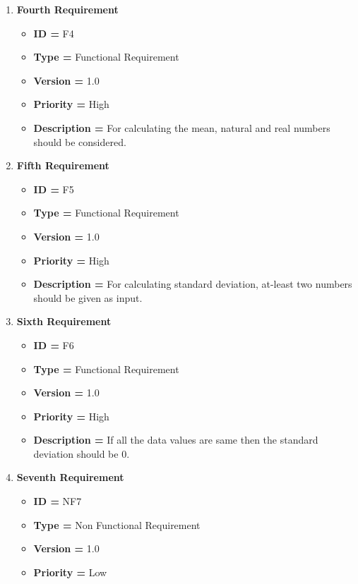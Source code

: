 \documentclass[a4paper, 12pt]{article}
\begin{document}
\begin{enumerate}[noitemsep]
        \newpage
        \item \textbf{Fourth Requirement}
        \begin{itemize}[noitemsep]
            \item \textbf{ID = } F4
            \item\textbf{Type = } Functional Requirement
            \item\textbf{Version = } 1.0
            \item\textbf{Priority = } High
            \item\textbf{Description = }   For calculating the mean, natural and real numbers should be considered.
        \end{itemize}
        \item \textbf{Fifth Requirement}
        \begin{itemize}[noitemsep]
            \item \textbf{ID = } F5
            \item\textbf{Type = } Functional Requirement
            \item\textbf{Version = } 1.0
            \item\textbf{Priority = } High
            \item\textbf{Description = }   For calculating standard deviation, at-least two numbers should be given as input.
        \end{itemize}
        \item \textbf{Sixth Requirement}
        \begin{itemize}[noitemsep]
            \item \textbf{ID = } F6
            \item\textbf{Type = } Functional Requirement
            \item\textbf{Version = } 1.0
            \item\textbf{Priority = } High
            \item\textbf{Description = }   If all the data values are same then the standard deviation should be 0.
        \end{itemize}
        \item \textbf{Seventh Requirement}
        \begin{itemize}[noitemsep]
            \item \textbf{ID = } NF7
            \item\textbf{Type = } Non Functional Requirement
            \item\textbf{Version = } 1.0
            \item\textbf{Priority = } Low

\end{itemize}
\end{enumerate}
\end{document}
